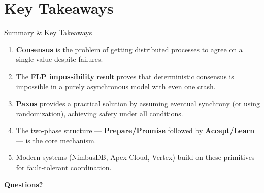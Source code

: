 \section{Key Takeaways}

\begin{frame}{Summary \& Key Takeaways}
\begin{enumerate}
  \item \textbf{Consensus} is the problem of getting distributed processes to agree on a single value despite failures.

  \vspace{4pt}
  \item The \textbf{FLP impossibility} result proves that deterministic consensus is impossible in a purely asynchronous model with even one crash.

  \vspace{4pt}
  \item \textbf{Paxos} provides a practical solution by assuming eventual synchrony (or using randomization), achieving safety under all conditions.

  \vspace{4pt}
  \item The two-phase structure --- \textbf{Prepare/Promise} followed by \textbf{Accept/Learn} --- is the core mechanism.

  \vspace{4pt}
  \item Modern systems (NimbusDB, Apex Cloud, Vertex) build on these primitives for fault-tolerant coordination.
\end{enumerate}

\vspace{12pt}
\begin{center}
\Large\textcolor{primaryblue}{\textbf{Questions?}}
\end{center}
\end{frame}
